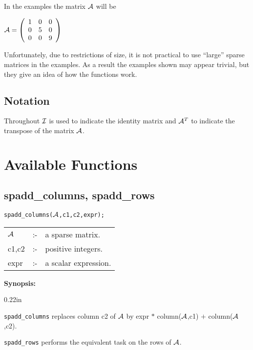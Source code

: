 In the examples the matrix ${\cal A}$ will be 

\begin{flushleft}
\begin{math}
{\cal A} = \left( \begin{array}{ccc} 1 & 0 & 0 \\ 0 & 5 & 0 \\ 0 & 0 & 9
\end{array} \right)
\end{math}
\end{flushleft}
Unfortunately, due to restrictions of size, it is not practical to use
``large'' sparse matrices in the examples. As a result the examples 
shown may appear trivial, but they give an idea of how the functions 
work.  

\subsection*{Notation}

Throughout ${\cal I}$ is used to indicate the identity matrix and 
${\cal A}^T$ to indicate the transpose of the matrix ${\cal A}$.

\section{Available Functions}

\subsection{spadd\_columns, spadd\_rows}

\hspace*{0.175in} {\tt spadd\_columns(${\cal A}$,c1,c2,expr);} 

\hspace*{0.1in}
\begin{tabular}{l l l}
${\cal A}$ & :- & a sparse matrix. \\
c1,c2      & :- & positive integers. \\
expr       & :- & a scalar expression. 
\end{tabular}

{\bf Synopsis:}

\begin{addtolength}{\leftskip}{0.22in}
\parbox[t]{0.95\linewidth}{{\tt spadd\_columns} replaces column c2 of 
${\cal A}$ by expr $*$ column(${\cal A}$,c1) $+$ column(${\cal A}$,c2).}

{\tt spadd\_rows} performs the equivalent task on the rows of ${\cal A}$.

\end{addtolength}

